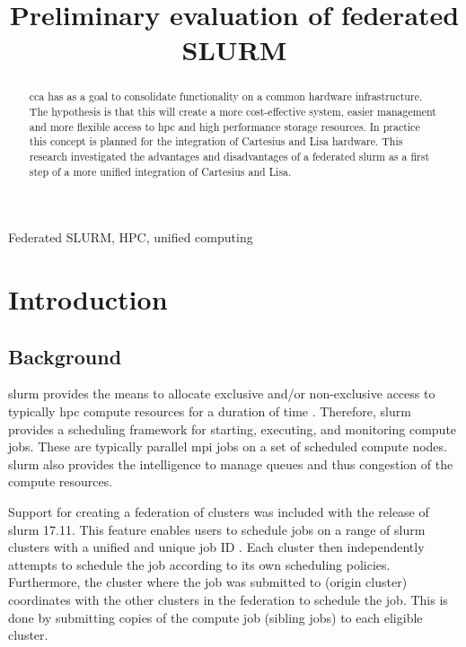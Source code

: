 \documentclass[conference]{IEEEtran}
\begin{document}
\title{Preliminary evaluation of federated SLURM}

\author{
}

\maketitle

\begin{abstract}
\gls{cca} has as a goal to consolidate functionality on a common hardware infrastructure. The hypothesis is that this will create a more cost-effective system, easier management and more flexible access to \gls{hpc} and high performance storage resources. In practice this concept is planned for the integration of Cartesius \cite{cartesius-userinfo} and Lisa \cite{lisa-userinfo} hardware. This research investigated the advantages and disadvantages of a federated \gls{slurm} as a first step of a more unified integration of Cartesius and Lisa.
\end{abstract}

\begin{IEEEkeywords}
Federated SLURM, HPC, unified computing
\end{IEEEkeywords}


\section{Introduction}
\subsection{Background}
\label{sec-background}
\gls{slurm} provides the means to allocate exclusive and/or non-exclusive access to typically \gls{hpc} compute resources for a duration of time \cite{wiki-slurm}. Therefore, \gls{slurm} provides a scheduling framework for starting, executing, and monitoring compute jobs. These are typically parallel \gls{mpi} jobs on a set of scheduled compute nodes. \gls{slurm} also provides the intelligence to manage queues and thus congestion of the compute resources.

Support for creating a federation of clusters was included with the release of \gls{slurm} 17.11. This feature enables users to schedule jobs on a range of \gls{slurm} clusters with a unified and unique job ID \cite{slurm-federated-guide}. Each cluster then independently attempts to schedule the job according to its own scheduling policies. Furthermore, the cluster where the job was submitted to (origin cluster) coordinates with the other clusters in the federation to schedule the job. This is done by submitting copies of the compute job (sibling jobs) to each eligible cluster.
\end{document}
